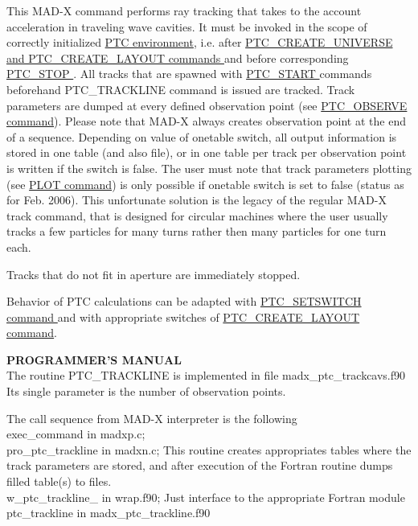 This MAD-X command performs ray tracking that takes to the account
acceleration in traveling wave cavities. It must be invoked in the scope
of correctly initialized \href{../ptc_general/ptc_general.html}{ PTC
  environment}, i.e. after \href{../ptc_general/ptc_general.html}{
  PTC\_CREATE\_UNIVERSE and PTC\_CREATE\_LAYOUT commands } and before
corresponding \href{../ptc_general/ptc_general.html}{ PTC\_STOP }. All
tracks that are spawned with \href{../ptc_track/ptc_track.html}{
  PTC\_START } commands beforehand PTC\_TRACKLINE command is issued are
tracked. Track parameters are dumped at every defined observation point
(see \href{../ptc_track/ptc_track.html}{ PTC\_OBSERVE command}). Please
note that MAD-X always creates observation point at the end of a
sequence. Depending on value of onetable switch, all output information
is stored in one table (and also file), or in one table per track per
observation point is written if the switch is false. The user must note
that track parameters plotting (see \href{../plot/plot.html}{ PLOT
  command}) is only possible if onetable switch is set to false (status
as for Feb. 2006). This unfortunate solution is the legacy of the
regular MAD-X track command, that is designed for circular machines
where the user usually tracks a few particles for many turns rather then
many particles for one turn each.  

Tracks that do not fit in aperture are immediately stopped. 

Behavior of PTC calculations can be adapted with
\href{../ptc_auxiliaries/PTC_SetSwitch.html}{ PTC\_SETSWITCH command }
and with appropriate switches of
\href{http://cern.ch/madx/ptc_general/ptc_general.html}{
  PTC\_CREATE\_LAYOUT command}.  


{\bf PROGRAMMER'S MANUAL}\\
The routine PTC\_TRACKLINE is implemented in file
madx\_ptc\_trackcavs.f90\\
Its single parameter is the number of observation points.  

The call sequence from MAD-X interpreter is the following 
\\ exec\_command in madxp.c; 
\\ pro\_ptc\_trackline in madxn.c; This routine creates appropriates
tables where the track parameters are stored, and after execution of the
Fortran routine dumps filled table(s) to files. 
\\ w\_ptc\_trackline\_ in wrap.f90; Just interface to the appropriate
Fortran module  
\\ ptc\_trackline in madx\_ptc\_trackline.f90 

